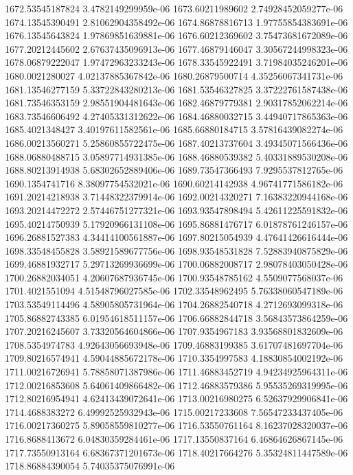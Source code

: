 {1672.53545187824 3.4782149299959e-06
1673.60211989602 2.74928452059277e-06
1674.13545390491 2.81062904358492e-06
1674.86878816713 1.97755854383691e-06
1676.13545643824 1.97869851639881e-06
1676.60212369602 3.75473681672089e-06
1677.20212445602 2.67637435096913e-06
1677.46879146047 3.30567244998323e-06
1678.06879222047 1.97472963233243e-06
1678.33545922491 3.71984035246201e-06
1680.0021280027 4.02137885367842e-06
1680.26879500714 4.35256067341731e-06
1681.13546277159 5.33722843280213e-06
1681.53546327825 3.37222761587438e-06
1681.73546353159 2.98551904481643e-06
1682.46879779381 2.90317852062214e-06
1683.73546606492 4.27405331312622e-06
1684.46880032715 3.44940717865363e-06
1685.4021348427 3.40197611582561e-06
1685.66880184715 3.57816439082274e-06
1686.00213560271 5.25860855722475e-06
1687.40213737604 3.49345071566436e-06
1688.06880488715 3.05897714931385e-06
1688.46880539382 5.40331889530208e-06
1688.80213914938 5.68302652889406e-06
1689.73547366493 7.9295537812765e-06
1690.1354741716 8.38097754532021e-06
1690.60214142938 4.96741771586182e-06
1691.20214218938 3.71448322379914e-06
1692.00214320271 7.16383220944168e-06
1693.20214472272 2.57446751277321e-06
1693.93547898494 5.42611225591832e-06
1695.40214750939 5.17920966131108e-06
1695.86881476717 6.01878761246157e-06
1696.26881527383 4.34414100561887e-06
1697.80215054939 4.47641426616444e-06
1698.33548455828 3.58921589677756e-06
1698.93548531828 7.52883940875829e-06
1699.46881932717 5.29713269936699e-06
1700.06882008717 2.98078403050428e-06
1700.26882034051 4.20607687936745e-06
1700.93548785162 4.5509077568037e-06
1701.4021551094 4.51548796027585e-06
1702.33548962495 5.76338060547189e-06
1703.53549114496 4.58905805731964e-06
1704.26882540718 4.2712693099318e-06
1705.86882743385 6.01954618511157e-06
1706.66882844718 3.56843573864259e-06
1707.20216245607 3.73320564604866e-06
1707.9354967183 3.93568801832609e-06
1708.5354974783 4.92643056693948e-06
1709.46883199385 3.61707481697704e-06
1709.80216574941 4.59044885672178e-06
1710.3354997583 4.18830854002192e-06
1711.00216726941 5.78858071387986e-06
1711.46883452719 4.94234925964311e-06
1712.00216853608 5.64061409866482e-06
1712.46883579386 5.95535269319995e-06
1712.80216954941 4.62413439072641e-06
1713.00216980275 6.52637929906841e-06
1714.4688383272 6.49992525932943e-06
1715.00217233608 7.56547233437405e-06
1716.00217360275 5.89058559810277e-06
1716.53550761164 8.16237028320037e-06
1716.8688413672 6.04830359284461e-06
1717.13550837164 6.46864626867145e-06
1717.73550913164 6.68367371201673e-06
1718.40217664276 5.35324811447589e-06
1718.86884390054 5.74035375076991e-06
}
